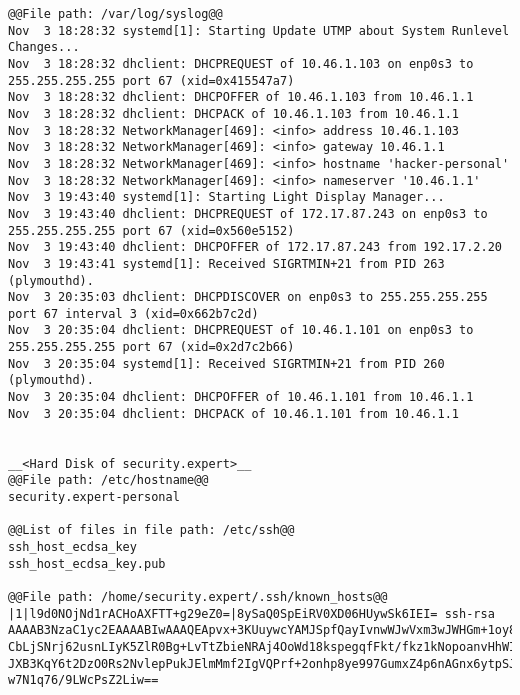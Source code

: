 \documentclass[addpoints]{exam}
\begin{document}
\begin{questions}
\begin{lstlisting}
@@File path: /var/log/syslog@@
Nov  3 18:28:32 systemd[1]: Starting Update UTMP about System Runlevel Changes...
Nov  3 18:28:32 dhclient: DHCPREQUEST of 10.46.1.103 on enp0s3 to 255.255.255.255 port 67 (xid=0x415547a7)
Nov  3 18:28:32 dhclient: DHCPOFFER of 10.46.1.103 from 10.46.1.1
Nov  3 18:28:32 dhclient: DHCPACK of 10.46.1.103 from 10.46.1.1
Nov  3 18:28:32 NetworkManager[469]: <info> address 10.46.1.103
Nov  3 18:28:32 NetworkManager[469]: <info> gateway 10.46.1.1
Nov  3 18:28:32 NetworkManager[469]: <info> hostname 'hacker-personal'
Nov  3 18:28:32 NetworkManager[469]: <info> nameserver '10.46.1.1'
Nov  3 19:43:40 systemd[1]: Starting Light Display Manager...
Nov  3 19:43:40 dhclient: DHCPREQUEST of 172.17.87.243 on enp0s3 to 255.255.255.255 port 67 (xid=0x560e5152)
Nov  3 19:43:40 dhclient: DHCPOFFER of 172.17.87.243 from 192.17.2.20
Nov  3 19:43:41 systemd[1]: Received SIGRTMIN+21 from PID 263 (plymouthd).
Nov  3 20:35:03 dhclient: DHCPDISCOVER on enp0s3 to 255.255.255.255 port 67 interval 3 (xid=0x662b7c2d)
Nov  3 20:35:04 dhclient: DHCPREQUEST of 10.46.1.101 on enp0s3 to 255.255.255.255 port 67 (xid=0x2d7c2b66)
Nov  3 20:35:04 systemd[1]: Received SIGRTMIN+21 from PID 260 (plymouthd).
Nov  3 20:35:04 dhclient: DHCPOFFER of 10.46.1.101 from 10.46.1.1
Nov  3 20:35:04 dhclient: DHCPACK of 10.46.1.101 from 10.46.1.1


__<Hard Disk of security.expert>__
@@File path: /etc/hostname@@
security.expert-personal

@@List of files in file path: /etc/ssh@@
ssh_host_ecdsa_key
ssh_host_ecdsa_key.pub  

@@File path: /home/security.expert/.ssh/known_hosts@@
|1|l9d0NOjNd1rACHoAXFTT+g29eZ0=|8ySaQ0SpEiRV0XD06HUywSk6IEI= ssh-rsa AAAAB3NzaC1yc2EAAAABIwAAAQEApvx+3KUuywcYAMJSpfQayIvnwWJwVxm3wJWHGm+1oy8    CbLjSNrj62usnLIyK5ZlR0Bg+LvTtZbieNRAj4OoWd18kspegqfFkt/fkz1kNopoanvHhWIxTCWwsgjSMnkS0ZPeEPLRy7ddvp7pMo1E3QtB5wVUxT9a6uzxfH327Tel+KMClvdPniFi    JXB3KqY6t2DzO0Rs2NvlepPukJElmMmf2IgVQPrf+2onhp8ye997GumxZ4p6nAGnx6ytpSJZrYQMGKl/0G6s5ZfPmSmJPAa1/gRQ9yOZlxbFeZETfwO0BP2G0FXQa/rBp0/i5GC6Euov    w7N1q76/9LWcPsZ2Liw==

\end{lstlisting}

\end{questions}
\end{document}
